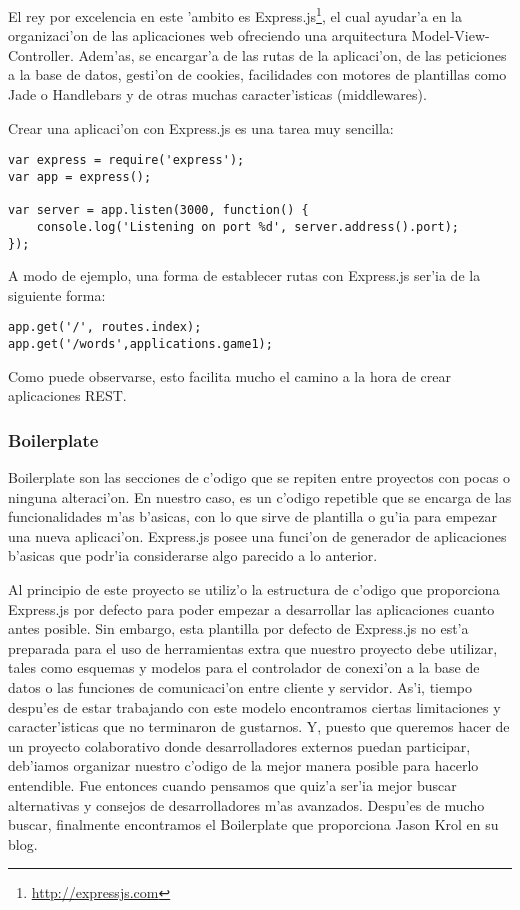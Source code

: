 El rey por excelencia en este 'ambito es Express.js\footnote{\url{http://expressjs.com}}, el cual ayudar'a en la organizaci'on de las aplicaciones web ofreciendo una arquitectura
Model-View-Controller. Adem'as, se encargar'a de las rutas de la aplicaci'on, de las peticiones a la base de datos, gesti'on de cookies,
facilidades con motores de plantillas como Jade o Handlebars y de otras muchas caracter'isticas (middlewares).

Crear una aplicaci'on con Express.js es una tarea muy sencilla:

\begin{verbatim}
var express = require('express');
var app = express();

var server = app.listen(3000, function() {
    console.log('Listening on port %d', server.address().port);
});
\end{verbatim}


A modo de ejemplo, una forma de establecer rutas con Express.js ser'ia de la siguiente forma:
\begin{verbatim}
app.get('/', routes.index);
app.get('/words',applications.game1);
\end{verbatim}

Como puede observarse, esto facilita mucho el camino a la hora de crear aplicaciones REST.

\subsubsection{Boilerplate}
\label{sub:boilerplate}
Boilerplate son las secciones de c'odigo que se repiten entre proyectos con pocas o ninguna alteraci'on. En nuestro caso, es un c'odigo repetible
que se encarga de las funcionalidades m'as b'asicas, con lo que sirve de plantilla o gu'ia para empezar una nueva aplicaci'on. Express.js posee
una funci'on de generador de aplicaciones b'asicas que podr'ia considerarse algo parecido a lo anterior.

Al principio de este proyecto se utiliz'o la estructura de c'odigo que proporciona Express.js por defecto para poder empezar a desarrollar las aplicaciones
cuanto antes posible. Sin embargo, esta plantilla por defecto de Express.js no est'a preparada para el uso de herramientas extra que nuestro proyecto debe utilizar,
tales como esquemas y modelos para el controlador de conexi'on a la base de datos o las funciones de comunicaci'on entre cliente y servidor. As'i, tiempo
despu'es de estar trabajando con este modelo encontramos ciertas limitaciones y caracter'isticas que no terminaron de gustarnos. Y, puesto que
queremos hacer de \Nipponline{} un proyecto colaborativo donde desarrolladores externos puedan participar, deb'iamos organizar nuestro c'odigo de la
mejor manera posible para hacerlo entendible. Fue entonces cuando pensamos que quiz'a ser'ia mejor buscar alternativas y consejos de desarrolladores
m'as avanzados. Despu'es de mucho buscar, finalmente encontramos el Boilerplate que proporciona Jason Krol en su blog\cite{jkrol}.

